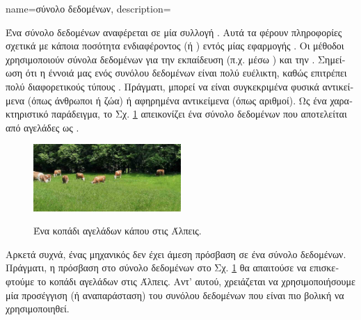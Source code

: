 {name={\foreignlanguage{greek}{σύνολο δεδομένων}},
	description={\foreignlanguage{greek}{Ένα σύνολο δεδομένων αναφέρεται σε μία συλλογή} 
		. \foreignlanguage{greek}{Αυτά τα}  \foreignlanguage{greek}{φέρουν πληροφορίες 
		σχετικά με κάποια ποσότητα ενδιαφέροντος (ή} ) \foreignlanguage{greek}{εντός μίας εφαρμογής}  
		. \foreignlanguage{greek}{Οι μέθοδοι}  \foreignlanguage{greek}{χρησιμοποιούν σύνολα δεδομένων για την 
		εκπαίδευση}  \foreignlanguage{greek}{(π.χ. μέσω} ) \foreignlanguage{greek}{και την}
		 . \foreignlanguage{greek}{Σημείωση ότι η έννοιά μας ενός συνόλου δεδομένων είναι πολύ ευέλικτη, 
		καθώς επιτρέπει πολύ διαφορετικούς τύπους} . \foreignlanguage{greek}{Πράγματι},  
		\foreignlanguage{greek}{μπορεί να είναι συγκεκριμένα φυσικά αντικείμενα  
		(όπως άνθρωποι ή ζώα) ή αφηρημένα αντικείμενα (όπως αριθμοί). 
		Ως ένα χαρακτηριστικό παράδειγμα, το Σχ.} \ref{fig_cows_dataset_dict} \foreignlanguage{greek}{απεικονίζει ένα σύνολο δεδομένων που 
		αποτελείται από αγελάδες ως} . 
		\begin{figure}[H]
		\begin{center}
		\label{fig:cowsintheswissalps_dict}
		\includegraphics[width=0.5\textwidth]{assets/CowsAustria.jpg}
		 \end{center}
		{
		\caption{\label{fig_cows_dataset_dict}\foreignlanguage{greek}{Ένα κοπάδι αγελάδων κάπου στις Άλπεις.}} }
	  	\end{figure}
      	 	\foreignlanguage{greek}{Αρκετά συχνά, ένας μηχανικός}  \foreignlanguage{greek}{δεν έχει άμεση πρό\-σβαση σε ένα σύνολο δεδομένων. 
      	 	Πράγματι, η πρόσβαση στο σύνολο δεδομένων στο Σχ. \ref{fig_cows_dataset_dict} θα απαιτούσε να επισκεφτούμε το κοπάδι αγελάδων στις Άλπεις. 
       	 	Αντ' αυτού, χρειάζεται να χρησιμοποιήσουμε μία προσέγγιση (ή αναπαράσταση) του συνόλου δεδομένων που είναι πιο βολική να χρησιμοποιηθεί. 
}}}
